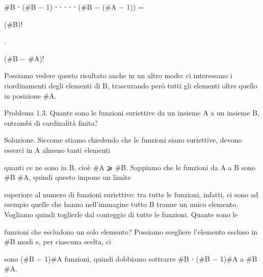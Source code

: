 \documentclass[a4paper,portrait,12pt]{article}
\begin{document}
\begin{flushleft}
\#B ⋅ (\#B $-$ 1) ⋅ ⋅ ⋅ ⋅ ⋅ (\#B $-$ (\#A $-$ 1)) =
\end{flushleft}





\begin{flushleft}
(\#B)!
\end{flushleft}


.


\begin{flushleft}
(\#B $-$ \#A)!
\end{flushleft}





\begin{flushleft}
Possiamo vedere questo risultato anche in un altro modo: ci interessano i riordinamenti degli elementi di B, trascurando per\`{o} tutti gli elementi oltre quello in posizione \#A.
\end{flushleft}


\begin{flushleft}
Problema 1.3. Quante sono le funzioni suriettive da un insieme A a un insieme B, entrambi di cardinalit\`{a} finita?
\end{flushleft}


\begin{flushleft}
Soluzione. Siccome stiamo chiedendo che le funzioni siano suriettive, devono esserci in A almeno tanti elementi
\end{flushleft}


\begin{flushleft}
quanti ce ne sono in B, cio\`{e} \#A ⩾ \#B. Sappiamo che le funzioni da A a B sono \#B \#A, quindi questo impone un limite
\end{flushleft}


\begin{flushleft}
superiore al numero di funzioni suriettive: tra tutte le funzioni, infatti, ci sono ad esempio quelle che hanno nell'immagine tutto B tranne un unico elemento. Vogliamo quindi toglierle dal conteggio di tutte le funzioni. Quante sono le
\end{flushleft}


\begin{flushleft}
funzioni che escludono un solo elemento? Possiamo scegliere l'elemento escluso in \#B modi e, per ciascuna scelta, ci
\end{flushleft}


\begin{flushleft}
sono (\#B $-$ 1)\#A funzioni, quindi dobbiamo sottrarre \#B ⋅ (\#B $-$ 1)\#A a \#B \#A.
\end{flushleft}
\end{document}
